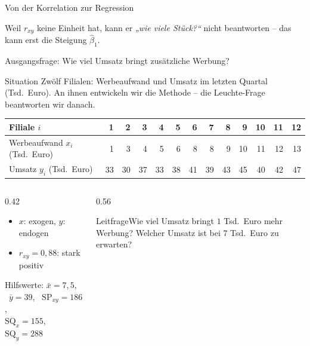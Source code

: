 \documentclass[aspectratio=169,11pt]{beamer}
\newcommand{\leitfrage}[1]{\begin{exampleblock}{Leitfrage}#1\end{exampleblock}}
\newcommand{\SQx}{\text{SQ}_x}
\newcommand{\SQy}{\text{SQ}_y}
\newcommand{\SPxy}{\text{SP}_{xy}}
\begin{document}
\begin{frame}{Von der Korrelation zur Regression}
  \smallskip
  {\footnotesize\color{hsbibluedark} Weil $r_{xy}$ keine Einheit hat, kann er \emph{„wie viele Stück?“}
    nicht beantworten -- das kann erst die Steigung $\hat{\beta}_1$.\par}
\end{frame}

\begin{frame}{Ausgangsfrage: Wie viel Umsatz bringt zusätzliche Werbung?}
  \begin{block}{Situation}
    Zwölf Filialen: Werbeaufwand und Umsatz im letzten Quartal (Tsd.~Euro).
    An ihnen entwickeln wir die Methode -- die Leuchte-Frage beantworten wir danach.
  \end{block}

  \medskip

  \begin{center}
    \renewcommand{\arraystretch}{1.1}
    \begin{tabular}{l*{12}{r}}
      \toprule
      Filiale $i$                     & 1  & 2  & 3  & 4  & 5  & 6  & 7  & 8  & 9  & 10 & 11 & 12 \\
      \midrule
      Werbeaufwand $x_i$ (Tsd.~Euro) & 1  & 3  & 4  & 5  & 6  & 8  & 8  & 9  & 10 & 11 & 12 & 13 \\
      Umsatz $y_i$ (Tsd.~Euro)       & 33 & 30 & 37 & 33 & 38 & 41 & 39 & 43 & 45 & 40 & 42 & 47 \\
      \bottomrule
    \end{tabular}
  \end{center}

  \medskip

  \begin{columns}[T]
    \begin{column}{0.42\textwidth}
      \begin{itemize}
        \item $x$: exogen, $y$: endogen
        \item $r_{xy} = 0{,}88$: stark positiv
      \end{itemize}
      \medskip
      {\footnotesize Hilfswerte: $\bar{x} = 7{,}5$, \ $\bar{y} = 39$, \ $\SPxy = 186$,\\
        $\SQx = 155$, \ $\SQy = 288$\par}
    \end{column}
    \begin{column}{0.56\textwidth}
      \leitfrage{Wie viel Umsatz bringt $1$ Tsd.~Euro mehr Werbung? Welcher
        Umsatz ist bei $7$ Tsd.~Euro zu erwarten?}
    \end{column}
  \end{columns}
\end{frame}
\end{document}
